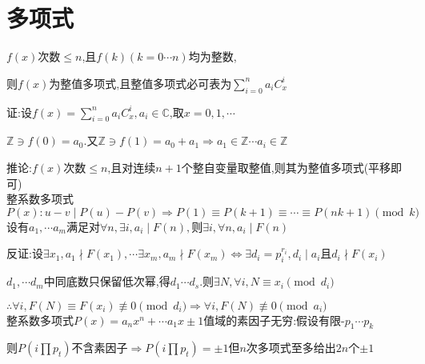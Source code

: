 \section{多项式}
$ f(x)$次数$ \le n$,且$ f(k)(k=0\cdots n)$均为整数,

则$ f(x)$为整值多项式,且整值多项式必可表为$ \sum_{i=0}^{n}{a_iC_x^i}$

证:设$ f(x)=\sum_{i=0}^{n}{a_iC_x^i},a_i \in \mathbb{C}$,取$ x=0,1,\cdots$

$ \mathbb{Z}\ni f(0)=a_0$.又$ \mathbb{Z}\ni f(1)=a_0+a_1\Rightarrow a_1\in \mathbb{Z}\cdots a_i\in \mathbb{Z}$

推论:$ f(x)$次数$ \le n$,且对连续$ n+1$个整自变量取整值,则其为整值多项式(平移即可)
\\

整系数多项式$ P(x):u-v \mid P(u)-P(v)\Rightarrow P(1)\equiv P(k+1) \equiv \cdots \equiv P(nk+1) \pmod k$
\\

设有$ a_1,\cdots a_m$满足对$ \forall n,\exists i,a_i\mid F(n),$则$ \exists i,\forall n,a_i\mid F(n)$

反证:设$ \exists x_1, a_1 \nmid F(x_1),\cdots \exists x_m, a_m \nmid F(x_m)
\Leftrightarrow \exists d_i=p_i^{r_i},d_i \mid a_i$且$ d_i\nmid F(x_i)$

$ d_1,\cdots d_m$中同底数只保留低次幂,得$ d_1\cdots d_s.$则$ \exists N ,\forall i,N\equiv x_i \pmod{d_i}$

$ \therefore \forall i,F(N)\equiv F(x_i)\not\equiv 0 \pmod{d_i}\Rightarrow \forall i,F(N)\not\equiv 0 \pmod{a_i}$
\\

整系数多项式$ P(x)=a_nx^n+\cdots a_1x\pm1$值域的素因子无穷:假设有限-$ p_1\cdots p_k$

则$ P(i\prod{p_t})$不含素因子$ \Rightarrow P(i\prod{p_t})=\pm 1$但$ n$次多项式至多给出$ 2n$个$ \pm 1$
\\

